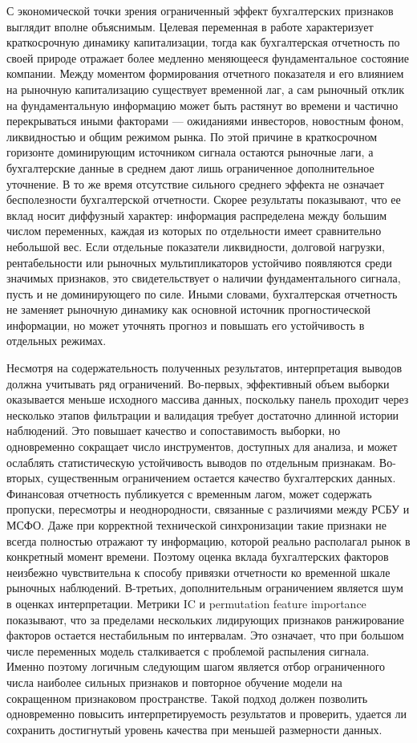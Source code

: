 \documentclass[
]{article}
\begin{document}
С экономической точки зрения ограниченный эффект бухгалтерских признаков выглядит вполне объяснимым. Целевая переменная в работе характеризует краткосрочную динамику капитализации, тогда как бухгалтерская отчетность по своей природе отражает более медленно меняющееся фундаментальное состояние компании. Между моментом формирования отчетного показателя и его влиянием на рыночную капитализацию существует временной лаг, а сам рыночный отклик на фундаментальную информацию может быть растянут во времени и частично перекрываться иными факторами --- ожиданиями инвесторов, новостным фоном, ликвидностью и общим режимом рынка. По этой причине в краткосрочном горизонте доминирующим источником сигнала остаются рыночные лаги, а бухгалтерские данные в среднем дают лишь ограниченное дополнительное уточнение. В то же время отсутствие сильного среднего эффекта не означает бесполезности бухгалтерской отчетности. Скорее результаты показывают, что ее вклад носит диффузный характер: информация распределена между большим числом переменных, каждая из которых по отдельности имеет сравнительно небольшой вес. Если отдельные показатели ликвидности, долговой нагрузки, рентабельности или рыночных мультипликаторов устойчиво появляются среди значимых признаков, это свидетельствует о наличии фундаментального сигнала, пусть и не доминирующего по силе. Иными словами, бухгалтерская отчетность не заменяет рыночную динамику как основной источник прогностической информации, но может уточнять прогноз и повышать его устойчивость в отдельных режимах.

Несмотря на содержательность полученных результатов, интерпретация выводов должна учитывать ряд ограничений. Во-первых, эффективный объем выборки оказывается меньше исходного массива данных, поскольку панель проходит через несколько этапов фильтрации и валидация требует достаточно длинной истории наблюдений. Это повышает качество и сопоставимость выборки, но одновременно сокращает число инструментов, доступных для анализа, и может ослаблять статистическую устойчивость выводов по отдельным признакам. Во-вторых, существенным ограничением остается качество бухгалтерских данных. Финансовая отчетность публикуется с временным лагом, может содержать пропуски, пересмотры и неоднородности, связанные с различиями между РСБУ и МСФО. Даже при корректной технической синхронизации такие признаки не всегда полностью отражают ту информацию, которой реально располагал рынок в конкретный момент времени. Поэтому оценка вклада бухгалтерских факторов неизбежно чувствительна к способу привязки отчетности ко временной шкале рыночных наблюдений. В-третьих, дополнительным ограничением является шум в оценках интерпретации. Метрики IC и permutation feature importance показывают, что за пределами нескольких лидирующих признаков ранжирование факторов остается нестабильным по интервалам. Это означает, что при большом числе переменных модель сталкивается с проблемой распыления сигнала. Именно поэтому логичным следующим шагом является отбор ограниченного числа наиболее сильных признаков и повторное обучение модели на сокращенном признаковом пространстве. Такой подход должен позволить одновременно повысить интерпретируемость результатов и проверить, удается ли сохранить достигнутый уровень качества при меньшей размерности данных.
\end{document}
